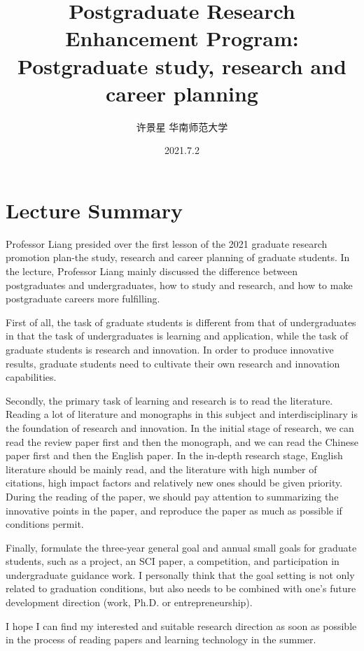 \documentclass[UTF-8]{ctexart}
\title{Postgraduate Research Enhancement Program: Postgraduate study, research and career planning}
\author{许景星 \quad 华南师范大学}
\date{2021.7.2}
\begin{document}
\maketitle
\thispagestyle{empty}
\clearpage

\pagestyle{plain}
\setcounter{page}{1}

\section{Lecture Summary}
Professor Liang presided over the first lesson of the 2021 graduate research promotion plan-the study, research and career planning of graduate students. In the lecture, Professor Liang mainly discussed the difference between postgraduates and undergraduates, how to study and research, and how to make postgraduate careers more fulfilling.\par


First of all, the task of graduate students is different from that of undergraduates in that the task of undergraduates is learning and application, while the task of graduate students is research and innovation. In order to produce innovative results, graduate students need to cultivate their own research and innovation capabilities.\par
Secondly, the primary task of learning and research is to read the literature. Reading a lot of literature and monographs in this subject and interdisciplinary is the foundation of research and innovation. In the initial stage of research, we can read the review paper first and then the monograph, and we can read the Chinese paper first and then the English paper. In the in-depth research stage, English literature should be mainly read, and the literature with high number of citations, high impact factors and relatively new ones should be given priority. During the reading of the paper, we should pay attention to summarizing the innovative points in the paper, and reproduce the paper as much as possible if conditions permit.\par
Finally, formulate the three-year general goal and annual small goals for graduate students, such as a project, an SCI paper, a competition, and participation in undergraduate guidance work. I personally think that the goal setting is not only related to graduation conditions, but also needs to be combined with one's future development direction (work, Ph.D. or entrepreneurship).\par
I hope I can find my interested and suitable research direction as soon as possible in the process of reading papers and learning technology in the summer.
\end{document}
